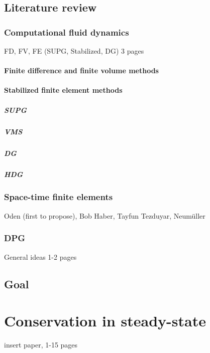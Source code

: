 \documentclass[12pt]{report}
\begin{document}
\section{Literature review}

\subsection{Computational fluid dynamics}
FD, FV, FE (SUPG, Stabilized, DG) 3 pages

\subsubsection{Finite difference and finite volume methods}

\subsubsection{Stabilized finite element methods}
\paragraph{SUPG}
\paragraph{VMS}
\paragraph{DG}
\paragraph{HDG}

\subsection{Space-time finite elements}
Oden (first to propose), Bob Haber, Tayfun Tezduyar, Neum\"{u}ller
\cite{Klaij2006}
\cite{Rhebergen2013}
\cite{Haber2006}

\subsection{DPG}
General ideas 1-2 pages


\section{Goal}



\chapter{Conservation in steady-state}
insert paper, 1-15 pages
\end{document}
